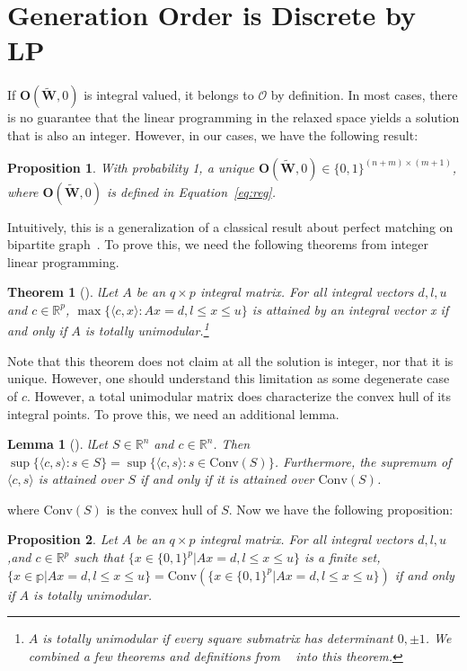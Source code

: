 \documentclass[11pt]{article}
\newtheorem{prop}{Proposition}
\newtheorem{theorem}{Theorem}
\newtheorem{lemma}{Lemma}
\begin{document}
\section{Generation Order is Discrete by LP} \label{append:valid}
If $\mathbf{O}( \widetilde{ \mathbf{W}},0) $ is integral valued, it  belongs to $\mathcal{O}$ by definition. In most cases, there is no guarantee that the linear programming in the relaxed space yields a solution that is also an integer.  However, in our cases, we have the following result:
\begin{prop}\label{prop:uni}
With probability 1, a unique $\mathbf{O}( \widetilde{ \mathbf{W}},0) \in \{0,1\}^{(n+m) \times (m +1)} $, where $\mathbf{O}( \widetilde{ \mathbf{W}},0)  $ is defined in Equation~\ref{eq:reg}.
\end{prop}
Intuitively, this is a generalization of a classical result about perfect matching on bipartite graph~\cite{Integer-Programming}. To prove this, we need the following theorems from integer linear programming.
\begin{theorem}[{\citealt[page 130,133]{Integer-Programming}}] l\label{thm:uni}
Let $A$ be an $q \times p$ integral matrix. For all integral vectors $ d, l, u  $ and  $c \in \mathbb{R}^p$,  $ \max\{\langle c,x\rangle  :  Ax = d, l \leq x \leq u\}$ is attained by an integral vector x  if and only if $ A$ is totally unimodular.\footnote{$A$ is totally unimodular if every square submatrix has determinant
$0,\pm 1$. We combined a few theorems and definitions from ~ into this theorem.}
\end{theorem}
Note that this theorem does not claim at all the solution is integer, nor that it is unique. However, one should understand this limitation as some degenerate case of $c$. However, a total unimodular matrix does characterize the convex hull of its integral points. To prove this, we need an additional lemma. 
\begin{lemma}[{\citealt[page 21]{Integer-Programming}}] l\label{lemme:convex_hull}
Let $S \in \mathbb{R}^n$ and $c \in \mathbb{R}^n$. Then $\sup \{\langle c,s \rangle  :s\in S \} = \sup \{\langle c,s \rangle  :s\in \mathrm{Conv}(S) \}$. Furthermore, the supremum of $\langle c,s \rangle $ is attained over $S$ if and only if it is
attained over $\mathrm{Conv}(S)$.
\end{lemma}
where $\mathrm{Conv}(S)$ is the convex hull of $S$. Now we have the following proposition:
\begin{prop}\label{prop:uni_convex_hull}
Let $A$ be an $q \times p$ integral matrix. For all integral vectors $ d, l, u  $ ,and  $c \in \mathbb{R}^p$ such that $\{ x \in \{0,1\}^p |  Ax = d, l \leq x \leq u\} $ is a finite set,  $\{ x \in \mathbb{p} |  Ax = d, l \leq x \leq u\} = \mathrm{Conv}(\{ x \in \{0,1\}^p |  Ax = d, l \leq x \leq u\})$  if and only if $ A$ is totally unimodular.
\end{prop}
\end{document}
